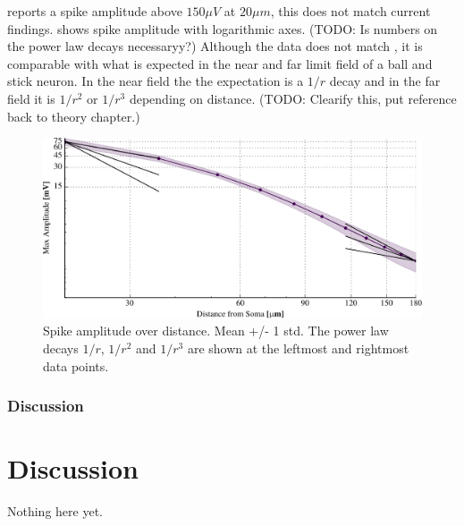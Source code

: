 \documentclass[altfont, fleqn]{uiophd}
\renewcommand{\cref}[1]{{\color{viridis_03}\mycref{#1}} }
\begin{document}
\textcite{pettersen_amplitude_2008} reports a spike amplitude above $150\mu V$ at 
$20\mu m$, this does not match current findings.  
\cref{fig:3_1_spike_amp} shows spike amplitude with logarithmic axes.  
(TODO: Is numbers on the power law decays necessaryy?) Although 
the data does not match \textcite{pettersen_amplitude_2008}, 
it is comparable with what is
expected in the near and far limit field of a ball and stick neuron.
In the near field the the expectation is a $1/r$ decay and in the far field
it is  $1/r^2$ or $1/r^3$ depending on distance. (TODO: Clearify this, put reference
back to theory chapter.)

\begin{figure}[thp]
\centering
\includegraphics[width=\textwidth]{images/4_1/circular_spike_amp_std_log.pdf}
\caption{Spike amplitude over distance. Mean +/- 1 std. The power law
decays $1/r$, $1/r^2$ and $1/r^3$ are shown at the leftmost and rightmost
data points.}
\label{fig:3_1_spike_amp}
\end{figure}

\subsection{Discussion}



\chapter{Discussion}
Nothing here yet.
\end{document}

